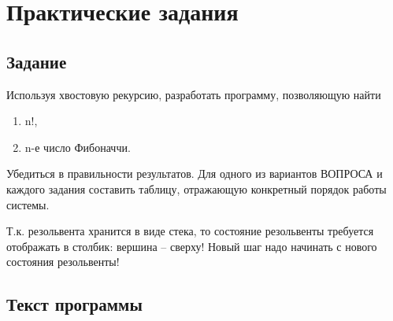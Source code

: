 \chapter{Практические задания}

\section{Задание}

Используя хвостовую рекурсию, разработать программу, позволяющую найти
\begin{enumerate}[label=\arabic*)]
    \item n!,
    \item n-е число Фибоначчи.
\end{enumerate}

Убедиться в правильности результатов.  Для одного из вариантов ВОПРОСА и каждого
задания составить таблицу, отражающую конкретный порядок работы системы.

Т.к.  резольвента хранится в виде стека, то состояние резольвенты требуется
отображать в столбик: вершина – сверху! Новый шаг надо начинать с нового
состояния резольвенты!

\clearpage
\section{Текст программы}


